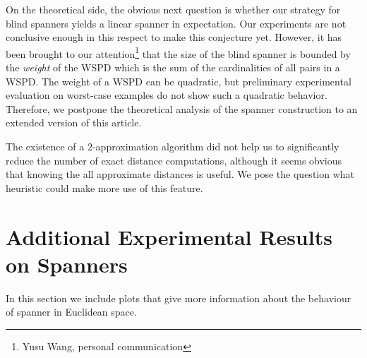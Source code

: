 On the theoretical side, the obvious next question is whether our strategy
for blind spanners yields a linear spanner in expectation. 
Our experiments are not conclusive enough in this respect to make this conjecture yet.
However, it has been brought to our attention\footnote{Yusu Wang, personal communication}
that the size of the blind spanner is bounded by the \emph{weight} of the WSPD
which is the sum of the  cardinalities of all pairs in a WSPD.
The weight of a WSPD can be quadratic, but preliminary
experimental evaluation on worst-case examples do not show such a quadratic
behavior. Therefore, we postpone the theoretical analysis of the spanner construction
to an extended version of this article.

The existence of a $2$-approximation algorithm did not help us to significantly
reduce the number of exact distance computations, although it seems obvious
that knowing the all approximate distances is useful.
We pose the question what heuristic could make more use of this feature.

\newpage

\appendix

\section{Additional Experimental Results on Spanners}
\label{sec:spanners_euclidean_addendum}
In this section we include plots that give more information
about the behaviour of \bgrdy spanner in Euclidean space.



